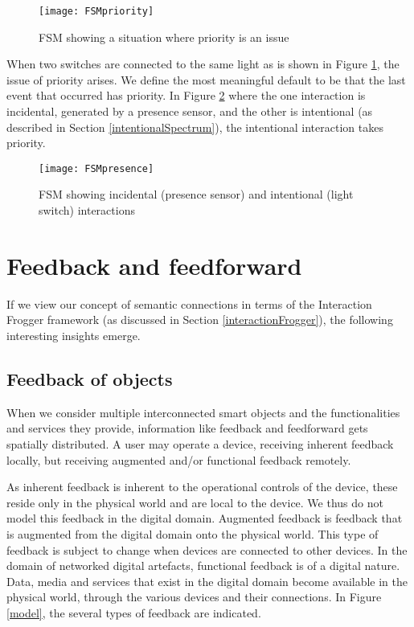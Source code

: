 \begin{figure}
\centerline{\texttt{[image: FSMpriority]}}
\caption{FSM showing a situation where priority is an issue}
\label{FSMpriority}
\end{figure}

When two switches are connected to the same light as is shown in Figure \ref{FSMpriority}, the issue of priority arises. We define the most meaningful default to be that the last event that occurred has priority. In Figure \ref{FSMpresence} where the one interaction is incidental, generated by a presence sensor, and the other is intentional (as described in Section \ref{intentionalSpectrum}), the intentional interaction takes priority.

\begin{figure}
\centerline{\texttt{[image: FSMpresence]}}
\caption{FSM showing incidental (presence sensor) and intentional (light switch) interactions}
\label{FSMpresence}
\end{figure}


\section{Feedback and feedforward}

If we view our concept of semantic connections in terms of the Interaction Frogger framework (as discussed in Section \ref{interactionFrogger}), the following interesting insights emerge.

\subsection{Feedback of objects}
When we consider multiple interconnected smart objects and the functionalities and services they provide, information like feedback and feedforward gets spatially distributed. A user may operate a device, receiving inherent feedback locally, but receiving augmented and/or functional feedback remotely. 

As inherent feedback is inherent to the operational controls of the device, these reside only in the physical world and are local to the device. We thus do not model this feedback in the digital domain. Augmented feedback is feedback that is augmented from the digital domain onto the physical world. This type of feedback is subject to change when devices are connected to other devices. In the domain of networked digital artefacts, functional feedback is of a digital nature. Data, media and services that exist in the digital domain become available in the physical world, through the various devices and their connections. In Figure \ref{model}, the several types of feedback are indicated. 

